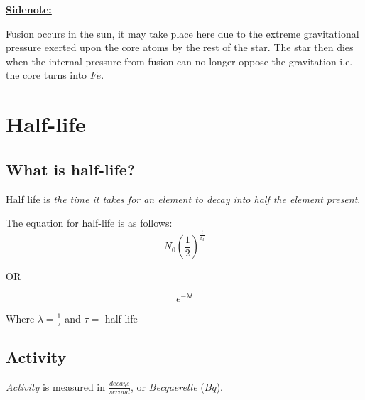 \documentclass[12pt]{article}
\begin{document}
\begin{boxA}

	\textbf{\underline{Sidenote:}} \bigbreak

Fusion occurs in the sun, it may take place here due to the
extreme gravitational pressure exerted upon the core atoms
 by the rest of the star. The star then dies when the 
 internal pressure from fusion can no longer oppose the gravitation
 i.e. the core turns into $Fe$.

\end{boxA}

\newpage

\section{Half-life}

\subsection{What is half-life?}

Half life is \emph{the time it takes for an element to 
decay into half the element present}. \bigbreak

The equation for half-life is as follows: 
$$N_0\left(\frac{1}{2} \right)^\frac{t}{t_d}$$

\begin{center}
OR
\end{center}
$$e^{-\lambda t}$$ 

\begin{center}
Where $\lambda = \frac{1}{\tau}$ and $\tau=$ half-life
\end{center}
	\bigbreak

\begin{center}
\end{center}


\subsection{Activity}
\emph{Activity} is measured in $\frac{decays}{second}$, or 
\emph{Becquerelle} ($Bq$). \bigbreak
\end{document}
